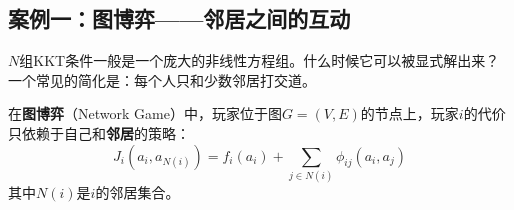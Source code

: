 \subsection{案例一：图博弈——邻居之间的互动}

$N$组KKT条件一般是一个庞大的非线性方程组。什么时候它可以被显式解出来？一个常见的简化是：每个人只和少数邻居打交道。

\begin{definition}[图博弈]
在\textbf{图博弈}（Network Game）中，玩家位于图$G = (V, E)$的节点上，玩家$i$的代价只依赖于自己和\textbf{邻居}的策略：
\begin{equation}
    J_i(a_i, a_{N(i)}) = f_i(a_i) + \sum_{j \in N(i)} \phi_{ij}(a_i, a_j)
\end{equation}
其中$N(i)$是$i$的邻居集合。
\end{definition}

